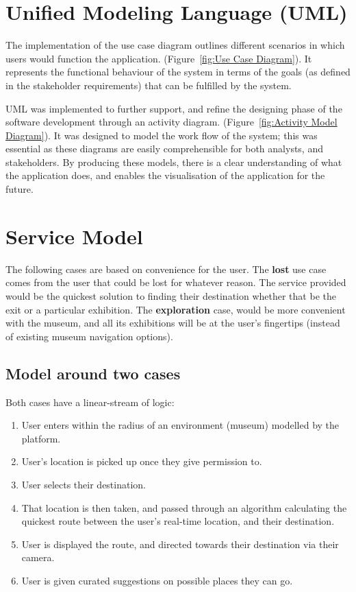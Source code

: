 
\section{Unified Modeling Language (UML)}

The implementation of the use case diagram outlines different scenarios in which users would function the application. (Figure~\ref{fig:Use Case Diagram}). It represents the functional behaviour of the system in terms of the goals (as defined in the stakeholder requirements) that can be fulfilled by the system.

UML was implemented to further support, and refine the designing phase of the software development through an activity diagram. (Figure~\ref{fig:Activity Model Diagram}). It was designed to model the work flow of the system; this was essential as these diagrams are easily comprehensible for both analysts, and stakeholders. By producing these models, there is a clear understanding of what the application does, and enables the visualisation of the application for the future.

\section{Service Model}
The following cases are based on convenience for the user. The \textbf{lost} use case comes from the user that could be lost for whatever reason. The service provided would be the quickest solution to finding their destination whether that be the exit or a particular exhibition. The \textbf{exploration} case, would be more convenient with the museum, and all its exhibitions will be at the user's fingertips (instead of existing museum navigation options).

\subsection*{Model around two cases}
Both cases have a linear-stream of logic:

\begin{enumerate}
    \item User enters within the radius of an environment (museum) modelled by the platform.
    \item User’s location is picked up once they give permission to.
    \item User selects their destination.
    \item That location is then taken, and passed through an algorithm calculating the quickest route between the user’s real-time location, and their destination.
    \item User is displayed the route, and directed towards their destination via their camera.
    \item User is given curated suggestions on possible places they can go.
\end{enumerate}
